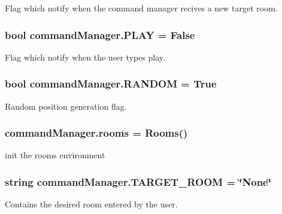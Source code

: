 Flag which notify when the command manager recives a new target room. 

\subsubsection[{\texorpdfstring{P\+L\+AY}{PLAY}}]{\setlength{\rightskip}{0pt plus 5cm}bool command\+Manager.\+P\+L\+AY = False}\hypertarget{namespacecommandManager_aecd980edd677f32e8693cbd21fa2c6eb}{}\label{namespacecommandManager_aecd980edd677f32e8693cbd21fa2c6eb}


Flag which notify when the user types \textquotesingle{}play\textquotesingle{}. 

\subsubsection[{\texorpdfstring{R\+A\+N\+D\+OM}{RANDOM}}]{\setlength{\rightskip}{0pt plus 5cm}bool command\+Manager.\+R\+A\+N\+D\+OM = True}\hypertarget{namespacecommandManager_afb1c5b8d9e6c746c82f4abf3fffe02a5}{}\label{namespacecommandManager_afb1c5b8d9e6c746c82f4abf3fffe02a5}


Random position generation flag. 

\subsubsection[{\texorpdfstring{rooms}{rooms}}]{\setlength{\rightskip}{0pt plus 5cm}command\+Manager.\+rooms = {\bf Rooms}()}\hypertarget{namespacecommandManager_a868809e1f6a79e7b7ce5ea405e978d48}{}\label{namespacecommandManager_a868809e1f6a79e7b7ce5ea405e978d48}


init the rooms environment 

\subsubsection[{\texorpdfstring{T\+A\+R\+G\+E\+T\+\_\+\+R\+O\+OM}{TARGET_ROOM}}]{\setlength{\rightskip}{0pt plus 5cm}string command\+Manager.\+T\+A\+R\+G\+E\+T\+\_\+\+R\+O\+OM = \char`\"{}None\char`\"{}}\hypertarget{namespacecommandManager_ace76b1a89b584c851c50bc3ad66e1d69}{}\label{namespacecommandManager_ace76b1a89b584c851c50bc3ad66e1d69}


Contains the desired room entered by the user. 

